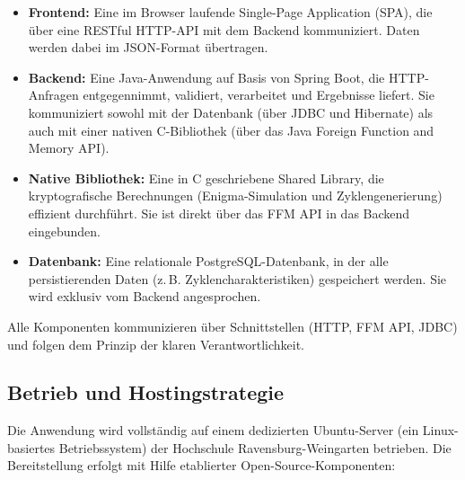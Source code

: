 \documentclass[12pt, ngerman, a4paper, numbers=noenddot]{article}
\begin{document}
\begin{itemize}
	\item \textbf{Frontend:} Eine im Browser laufende Single-Page Application (SPA), die über eine RESTful HTTP-API mit dem Backend kommuniziert. Daten werden dabei im JSON-Format übertragen.
	
	\item \textbf{Backend:} Eine Java-Anwendung auf Basis von Spring Boot, die HTTP-Anfragen entgegennimmt, validiert, verarbeitet und Ergebnisse liefert. Sie kommuniziert sowohl mit der Datenbank (über JDBC und Hibernate) als auch mit einer nativen C-Bibliothek (über das Java Foreign Function and Memory API).
	
	\item \textbf{Native Bibliothek:} Eine in C geschriebene Shared Library, die kryptografische Berechnungen (Enigma-Simulation und Zyklengenerierung) effizient durchführt. Sie ist direkt über das FFM API in das Backend eingebunden.
	
	\item \textbf{Datenbank:} Eine relationale PostgreSQL-Datenbank, in der alle persistierenden Daten (z.\,B. Zyklencharakteristiken) gespeichert werden. Sie wird exklusiv vom Backend angesprochen.
\end{itemize}

Alle Komponenten kommunizieren über Schnittstellen (HTTP, FFM API, JDBC) und folgen dem Prinzip der klaren Verantwortlichkeit.

\newpage
\subsection{Betrieb und Hostingstrategie}

Die Anwendung wird vollständig auf einem dedizierten Ubuntu-Server (ein Linux-basiertes Betriebssystem) der Hochschule Ravensburg-Weingarten betrieben. Die Bereitstellung erfolgt mit Hilfe etablierter Open-Source-Komponenten:
\end{document}
